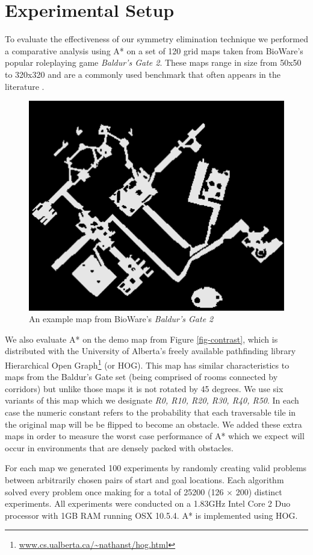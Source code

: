 \section{Experimental Setup}
To evaluate the effectiveness of our symmetry elimination technique we performed
a comparative analysis using A* on a set of 120 grid maps taken from BioWare's 
popular roleplaying game \emph{Baldur's Gate 2}. 
These maps range in size from 50x50 to 320x320 and are a commonly used benchmark 
that often appears in the literature 
\cite{botea04,bjornsson05,bjornsson06,sturtevant05,harabor08}.
\begin{figure}[t]
       \begin{center}
                       \includegraphics[scale=0.50, trim = 10mm 10mm 10mm 0mm]{diagrams/bgmap.png}
       \end{center}
       \caption{An example map from BioWare's \emph{Baldur's Gate 2}}
       \label{fig-bgmap}
\end{figure}
\par
We also evaluate A* on the demo map from Figure \ref{fig-contrast},
 which is distributed with the University of Alberta's freely available pathfinding library 
Hierarchical Open Graph\footnote{\url{www.cs.ualberta.ca/~nathanst/hog.html}} (or HOG).
This map has similar characteristics to maps from the Baldur's Gate set (being comprised of rooms
connected by corridors) but unlike those maps it is not rotated by 45 degrees. 
We use six variants of this map which we designate \emph{R0, R10, R20, R30, R40, R50}.
In each case the numeric constant refers to the probability that each traversable tile 
in the original map will be be flipped to become an obstacle.
We added these extra maps in order to measure the worst case performance of A* which we expect will occur in 
environments that are densely packed with obstacles.
\par
For each map we generated 100 experiments by randomly creating valid problems between arbitrarily chosen 
pairs of start and goal locations.
Each algorithm solved every problem once making for a total of 25200 (126 $\times$ 200) distinct experiments.
All experiments were conducted on a 1.83GHz Intel Core 2 Duo processor with 1GB RAM running OSX 10.5.4.
A* is implemented using HOG.
